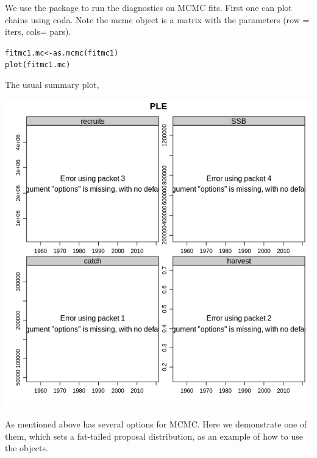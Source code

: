 \documentclass[a4paper,english,10pt]{article}\usepackage[]{graphicx}\usepackage[]{color}
\makeatletter
\newcommand{\hlstd}[1]{\textcolor[rgb]{0.196,0.196,0.196}{#1}}%
\newcommand{\hlkwb}[1]{\textcolor[rgb]{0.627,0,0.314}{#1}}%
\newcommand{\hlkwd}[1]{\textcolor[rgb]{0.78,0.227,0.412}{#1}}%
\newenvironment{kframe}{%
 \def\at@end@of@kframe{}%
 \ifinner\ifhmode%
  \def\at@end@of@kframe{\end{minipage}}%
  \begin{minipage}{\columnwidth}%
 \fi\fi%
 \def\FrameCommand##1{\hskip\@totalleftmargin \hskip-\fboxsep
 \colorbox{shadecolor}{##1}\hskip-\fboxsep
     \hskip-\linewidth \hskip-\@totalleftmargin \hskip\columnwidth}%
 \MakeFramed {\advance\hsize-\width
   \@totalleftmargin\z@ \linewidth\hsize
   \@setminipage}}%
 {\par\unskip\endMakeFramed%
 \at@end@of@kframe}
\newenvironment{knitrout}{}{} %
\makeatother
\begin{document}
We use the package  to run the diagnostics on MCMC fits. First one can plot chains using coda. Note the mcmc object is a matrix with the parameters (row = iters, cols= pars).

\begin{knitrout}
\color{fgcolor}\begin{kframe}
\begin{alltt}
\hlstd{fitmc1.mc} \hlkwb{<-} \hlkwd{as.mcmc}\hlstd{(fitmc1)}
\hlkwd{plot}\hlstd{(fitmc1.mc)}
\end{alltt}
\end{kframe}
\end{knitrout}

The usual summary plot,

\begin{knitrout}
\color{fgcolor}

{\centering \includegraphics[width=.9\linewidth]{figure/unnamed-chunk-33-1} 

}



\end{knitrout}

As mentioned above  has several options for MCMC. Here we demonstrate one of them,  which sets a fat-tailed proposal distribution, as an example of how to use the  objects.
\end{document}
